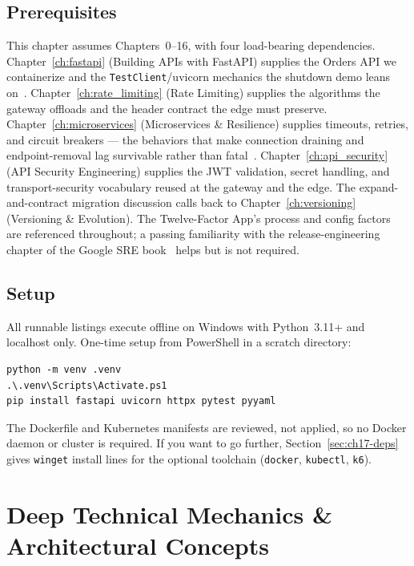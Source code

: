 \subsection*{Prerequisites}
This chapter assumes Chapters~0--16, with four load-bearing dependencies.
Chapter~\ref{ch:fastapi} (Building APIs with FastAPI) supplies the Orders
API we containerize and the \texttt{TestClient}/uvicorn mechanics the
shutdown demo leans on~\cite{fastapidocs}. Chapter~\ref{ch:rate_limiting}
(Rate Limiting) supplies the algorithms the gateway offloads and the
header contract the edge must preserve.
Chapter~\ref{ch:microservices} (Microservices \& Resilience) supplies
timeouts, retries, and circuit breakers --- the behaviors that make
connection draining and endpoint-removal lag survivable rather than
fatal~\cite{newman2021microservices}. Chapter~\ref{ch:api_security} (API
Security Engineering) supplies the JWT validation, secret handling, and
transport-security vocabulary reused at the gateway and the edge. The
expand-and-contract migration discussion calls back to
Chapter~\ref{ch:versioning} (Versioning \& Evolution). The Twelve-Factor
App's process and config factors~\cite{twelvefactor} are referenced
throughout; a passing familiarity with the release-engineering chapter of
the Google SRE book~\cite{beyer2016sre} helps but is not required.

\subsection*{Setup}
All runnable listings execute offline on Windows with Python~3.11+ and
localhost only. One-time setup from PowerShell in a scratch directory:

\begin{verbatim}
python -m venv .venv
.\.venv\Scripts\Activate.ps1
pip install fastapi uvicorn httpx pytest pyyaml
\end{verbatim}

The Dockerfile and Kubernetes manifests are reviewed, not applied, so no
Docker daemon or cluster is required. If you want to go further,
Section~\ref{sec:ch17-deps} gives \texttt{winget} install lines for the
optional toolchain (\texttt{docker}, \texttt{kubectl}, \texttt{k6}).

\section{Deep Technical Mechanics \& Architectural Concepts}
\label{sec:ch17-mechanics}

